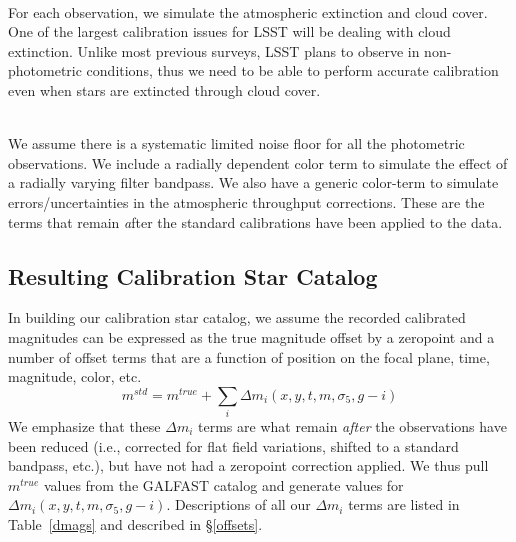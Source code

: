 \documentclass[12pt,preprint]{aastex}
\begin{document}
\\
For each observation, we simulate the atmospheric extinction and cloud cover.  One of the largest calibration issues for LSST will be dealing with cloud extinction.  Unlike most previous surveys, LSST plans to observe in non-photometric conditions, thus we need to be able to perform accurate calibration even when stars are extincted through cloud cover.  



\\
We assume there is a systematic limited noise floor for all the photometric observations.  We include a radially dependent color term to simulate the effect of a radially varying filter bandpass.  We also have a generic color-term to simulate errors/uncertainties in the atmospheric throughput corrections.  These are the terms that remain {\emph after} the standard calibrations have been applied to the data. 


\subsection{Resulting Calibration Star Catalog}


In building our calibration star catalog, we assume the recorded calibrated magnitudes can be expressed as the true magnitude offset by a zeropoint and a number of offset terms that are a function of position on the focal plane, time, magnitude, color, etc.
\begin{equation}
m^{std}=m^{true}+\sum_i\Delta m_i(x,y,t,m,\sigma_5, g-i)
\end{equation}
We emphasize that these $\Delta m_i$ terms are what remain {\emph{after}} the observations have been reduced (i.e., corrected for flat field variations, shifted to a standard bandpass, etc.), but have not had a zeropoint correction applied.  We thus pull $m^{true}$ values from the GALFAST catalog and generate values for $\Delta m_i(x,y,t,m,\sigma_5, g-i)$.  Descriptions of all our $\Delta m_i$ terms are listed in Table~\ref{dmags} and described in \S\ref{offsets}.  
\end{document}
